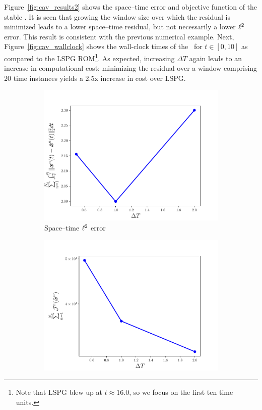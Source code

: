 Figure~\ref{fig:cav_results2} shows the space--time error and objective function of the stable \methodAcronymROMs. It is seen that growing the window size over 
which the residual is minimized leads to a lower space--time residual, but not necessarily a lower $\ell^2$ error. This result is consistent with the previous numerical example. Next, Figure~\ref{fig:cav_wallclock}
shows the wall-clock times of the \methodAcronymROMs\ for $t \in [0,10]$ as compared to the LSPG ROM\footnote{Note that LSPG blew up at $t \approx 16.0$, so we focus on the first ten time units.}. As expected, increasing $\Delta T$ again leads to an increase in computational cost; minimizing the residual over a window comprising 20 time instances yields a 2.5x increase in cost over LSPG. 


\begin{figure}
\begin{center}
\begin{subfigure}[t]{0.45\textwidth}
\includegraphics[trim={0cm 0cm 0cm 0cm},clip,width=1.\linewidth]{figs/cavity/error_vs_window_basis2.pdf}
\caption{Space--time $\ell^2$ error}
\label{fig:cav_results2a}
\end{subfigure}
\begin{subfigure}[t]{0.45\textwidth}
\includegraphics[trim={0cm 0cm 0cm 0cm},clip,width=1.\linewidth]{figs/cavity/objective_vs_window_basis2.pdf}

\end{subfigure}
\end{center}
\end{figure}
